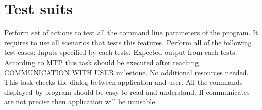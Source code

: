 \chapter{Test suits} \label{chp:test-suits}

{
	{
		Perform set of actions to test all the command line parameters of the program. It requires to use all scenarios that tests this features.
	}
	{
		Perform all of the following test cases:
	}
	{
		Inputs specified by each tests. 
	}
	{
		Expected output from each tests.
	}
	{
		According to \gls{MTP} this task should be executed after reaching \textsc{COMMUNICATION WITH USER} milestone.
	}
	{
		No additional resources needed.
	}
	{
		This task checks the dialog between application and user. All the commands displayed by program should be easy to read and understand. If communicates are not precise then application will be unusable.
	}
}